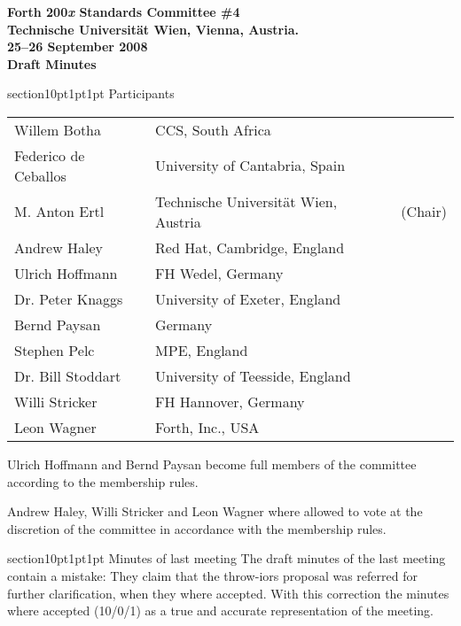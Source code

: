 \documentclass{article}
\makeatletter
\renewcommand{\section}{\@startsection
	{section}{1}{0pt}{1pt}{1pt}
	{\normalfont\bfseries}
}
\makeatother
\begin{document}
\pagestyle{empty}

\begin{center}\bf\large
Forth 200\emph{x} Standards Committee \#4 \\[6pt]
Technische Universit\"{a}t Wien, Vienna, Austria. \\[6pt]
25--26 September 2008 \\[12pt]
Draft Minutes
\end{center}

\section{Participants}
\label{members}

	\begin{tabular}{lll}
		Willem		Botha		& CCS, South Africa \\
		Federico de	Ceballos	& University of Cantabria, Spain \\
		M. Anton	Ertl		& Technische Universit\"{a}t Wien, Austria & (Chair) \\
		Andrew		Haley		& Red Hat, Cambridge, England \\
		Ulrich		Hoffmann	& FH Wedel, Germany	\\
		Dr. Peter	Knaggs		& University of Exeter, England \\
		Bernd		Paysan		& Germany \\
		Stephen		Pelc		& MPE, England \\
		Dr. Bill	Stoddart	& University of Teesside, England \\
		Willi		Stricker	& FH Hannover, Germany \\
		Leon		Wagner		& Forth, Inc., USA \\
	\end{tabular}

Ulrich Hoffmann and Bernd Paysan become full members of the
committee according to the membership rules.

Andrew Haley, Willi Stricker and Leon Wagner where allowed to vote at
the discretion of the committee in accordance with the membership
rules.

\section{Minutes of last meeting}
\label{minutes}
	The draft minutes of the last meeting contain a mistake:
	They claim that the \textsf{throw-iors} proposal was referred
	for further clarification, when they where accepted.  With
	this correction the minutes where accepted (10/0/1) as a true
	and accurate representation of the meeting.
\end{document}

